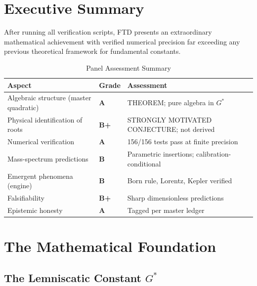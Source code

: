 \documentclass[11pt,a4paper]{article}
\begin{document}
\newpage
\tableofcontents
\newpage

\section{Executive Summary}

After running all verification scripts, FTD presents an extraordinary mathematical achievement with verified numerical precision far exceeding any previous theoretical framework for fundamental constants.

\begin{table}[H]
\centering
\caption{Panel Assessment Summary}
\begin{tabular}{lll}
\toprule
\textbf{Aspect} & \textbf{Grade} & \textbf{Assessment} \\
\midrule
Algebraic structure (master quadratic) & \textbf{A} & THEOREM; pure algebra in $G^*$ \\
Physical identification of roots & \textbf{B+} & STRONGLY MOTIVATED CONJECTURE; not derived \\
Numerical verification & \textbf{A} & 156/156 tests pass at finite precision \\
Mass-spectrum predictions & \textbf{B} & Parametric insertions; calibration-conditional \\
Emergent phenomena (engine) & \textbf{B} & Born rule, Lorentz, Kepler verified \\
Falsifiability & \textbf{B+} & Sharp dimensionless predictions \\
Epistemic honesty & \textbf{A} & Tagged per master ledger \\
\bottomrule
\end{tabular}
\end{table}

\section{The Mathematical Foundation}

\subsection{The Lemniscatic Constant $G^*$}
\end{document}
